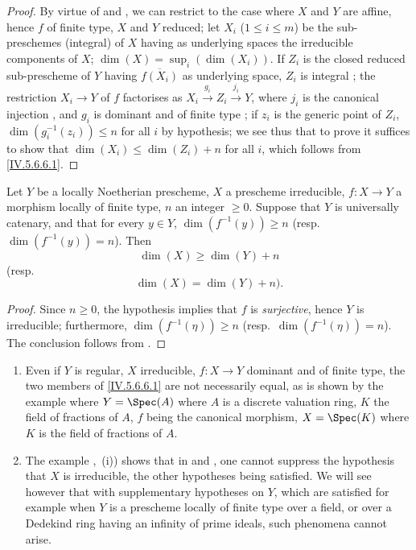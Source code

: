 \begin{proof}
By virtue of  and , we can restrict to the case where $X$ and $Y$ are affine, hence $f$ of finite type, $X$ and $Y$ reduced; let $X_i$ ($1\leq i\leq m$) be the sub-preschemes (integral) of $X$ having as underlying spaces the irreducible components of $X$; $\dim(X)=\sup_i(\dim(X_i))$.
If $Z_i$ is the closed reduced sub-prescheme of $Y$ having $\overline{f(X_i)}$ as underlying space, $Z_i$ is integral ; the restriction $X_i\to Y$ of $f$ factorises as $X_i\xrightarrow{g_i}Z_i\xrightarrow{j_i}Y$, where $j_i$ is the canonical injection , and $g_i$ is dominant and of finite type ; if $z_i$ is the generic point of $Z_i$, $\dim(g_i^{-1}(z_i))\leq n$ for all $i$ by hypothesis; we see thus that to prove  it suffices to show that $\dim(X_i)\leq\dim(Z_i)+n$ for all $i$, which follows from \eqref{IV.5.6.6.1}.
\end{proof}

\begin{corollary}[5.6.8]
\label{IV.5.6.8}
Let $Y$ be a locally Noetherian prescheme, $X$ a prescheme irreducible, $f:X\to Y$ a morphism locally of finite type, $n$ an integer $\geq 0$.
Suppose that $Y$ is universally catenary, and that for every $y\in Y$, $\dim(f^{-1}(y))\geq n$ (resp.\ $\dim(f^{-1}(y))=n$).
Then
\[
\tag{5.6.8.1}\label{IV.5.6.8.1}
  \dim(X) \geq \dim(Y) + n
\]
(resp.
\[
\tag{5.6.8.2}\label{IV.5.6.8.2}
  \dim(X) = \dim(Y) + n).
\]
\end{corollary}

\begin{proof}
Since $n\geq 0$, the hypothesis implies that $f$ is \emph{surjective}, hence $Y$ is irreducible; furthermore, $\dim(f^{-1}(\eta))\geq n$ (resp.\ $\dim(f^{-1}(\eta))=n$).
The conclusion follows from .
\end{proof}

\begin{remarks}[5.6.9]
\label{IV.5.6.9}
\begin{enumerate}[label=(\roman*)]
  \item Even if $Y$ is regular, $X$ irreducible, $f:X\to Y$ dominant and of finite type, the two members of \eqref{IV.5.6.6.1} are not necessarily equal, as is shown by the example where $Y=\Spec(A)$ where $A$ is a discrete valuation ring, $K$ the field of fractions of $A$, $f$ being the canonical morphism, $X=\Spec(K)$ where $K$ is the field of fractions of $A$.
  \item The example ,~(i)) shows that in  and , one cannot suppress the hypothesis that $X$ is irreducible, the other hypotheses being satisfied.
We will see however  that with supplementary hypotheses on $Y$, which are satisfied for example when $Y$ is a prescheme locally of finite type over a field, or over a Dedekind ring having an infinity of prime ideals, such phenomena cannot arise.
\end{enumerate}
\end{remarks}

